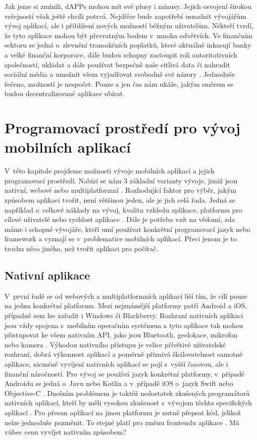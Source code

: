 Jak jsme si zmínili, dAPPs mohou mít své plusy i mínusy. Jejich osvojení širokou veřejností však ještě chvíli potrvá. Nejdříve bude zapotřebí usnadnit vývojářům vývoj aplikací, ale i přiblížení nových možností běžným uživatelům. Někteří tvrdí, že tyto aplikace mohou být převratným bodem v~mnoha odvětvích. Ve finančním sektoru se jedná o~zlevnění transakčních poplatků, které aktuálně inkasují banky a velké finanční korporace, dále budou schopny zastoupit roli autoritativních společností, ukládat a dále používat bezpečně naše citlivá data či nahradit sociální média a umožnit všem vyjadřovat svobodně své názory \cite{DAPPS2}. Jednoduše řečeno, možností je nespočet. Pouze a jen čas nám ukáže, jakým směrem se budou decentralizované aplikace ubírat.

\chapter{Programovací prostředí pro vývoj mobilních aplikací}
\label{chapter:3}
V~této kapitole projdeme možnosti vývoje mobilních aplikací a jejich programovací prostředí. Nabízí se nám 3 základní varianty vývoje, jimiž jsou nativní, webové nebo multiplatformní \cite{mobiles}. Rozhodující faktor pro výběr, jakým způsobem aplikaci tvořit, není většinou jeden, ale je jich celá řada. Jedná se například o~celkové náklady na vývoj, kvalitu vzhledu aplikace, platformu pro cílové uživatelé nebo rychlost aplikace \cite{AppsFrameworks}. Dále je potřeba vzít na vědomí, zda máme i schopné vývojáře, kteří umí používat konkrétní programovací jazyk nebo framework a vyznají se v~problematice mobilních aplikací. Přeci jenom je to trochu něco jiného, než tvořit aplikaci pro počítač.

\section{Nativní aplikace}
V~první řadě se od webových a multiplatformních aplikací liší tím, že cílí pouze na jednu konkrétní platformu. Mezi nejznámější platformy patří Android a iOS, případně sem lze zařadit i  Windows či Blackberry. Rozhraní nativních aplikaci jsou vždy spojena s~mobilním operačním systémem a tyto aplikace tak mohou přistupovat ke všem nativním API, jako jsou Bluetooth, geolokace, mikrofon nebo kamera \cite{mobiles}. Výhodou nativního přístupu je velice přívětivé uživatelské rozhraní, dobrá výkonnost aplikací a poměrně příznivá škálovatelnost samotné aplikace, nicméně vyvíjení nativních aplikací se pojí s~vyšší časovou, ale i finanční náročností. Pro vývoj se používá jazyk konkrétní platformy, v~případě Androidu se jedná o~Javu nebo Kotlin a v~případě iOS o~jazyk Swift nebo Objective-C \cite{mobilesuptech}. Dnešním problémem je taktéž nedostatek zkušených programátorů nativních aplikací, kteří by měli vysokou zkušenost s~vývojem těchto specifických aplikací \cite{mobilesamazon}. Pro přesun aplikací na jinou platformu je nutné přepsat kód, jelikož nelze jednoduše pozměnit. To stejné platí pro změnu frontendu aplikace \cite{mobilesibm}. Má vůbec cenu vyvíjet nativním způsobem?
